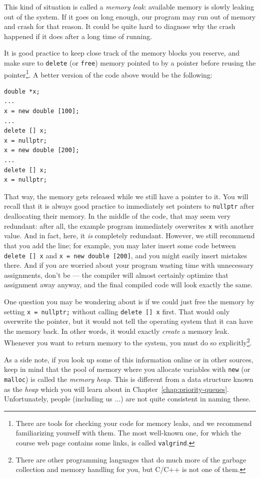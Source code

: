 This kind of situation is called a \emph{memory leak}:
available memory is slowly leaking out of the system.
If it goes on long enough, our program may run out of memory and crash
for that reason. It could be quite hard to diagnose why the crash
happened if it does after a long time of running.

It is good practice to keep close track of the memory blocks you
reserve, and make sure to \texttt{delete} (or \texttt{free}) memory
pointed to by a pointer before reusing the pointer\footnote{There are tools
for checking your code for memory leaks, and we recommend
familiarizing yourself with them. The most well-known one, for which
the course web page contains some links, is called \texttt{valgrind}.}.
A better version of the code above would be the following:

\begin{verbatim}
double *x;
...
x = new double [100];
...
delete [] x;
x = nullptr;
x = new double [200];
...
delete [] x;
x = nullptr;
\end{verbatim}

That way, the memory gets released while we still have a pointer to
it.
You will recall that it is always good practice to immediately set
pointers to \texttt{nullptr} after deallocating their memory.
In the middle of the code, that may seem very redundant:
after all, the example program immediately overwrites \texttt{x} with
another value. 
And in fact, here, it \emph{is} completely redundant.
However, we still recommend that you add the line;
for example, you may later insert some code between \texttt{delete [] x}
and \texttt{x = new double [200]}, and you might easily insert mistakes there.
And if you are worried about your program wasting time with
unnecessary assignments, don't be --- the compiler will almost certainly
optimize that assignment away anyway, and the final compiled code will look
exactly the same.

One question you may be wondering about is if we could just free the
memory by setting \texttt{x = nullptr;}
without calling \texttt{delete [] x} first.
That would only overwrite the pointer, but it would not tell the
operating system that it can have the memory back.
In other words, it would exactly \emph{create} a memory leak.
Whenever you want to return memory to the system, you must do so
explicitly\footnote{There are other programming languages that do much
  more of the garbage collection and memory handling for you,
  but C/C++ is not one of them.}. 

As a side note, if you look up some of this information online or in
other sources, keep in mind that the pool of memory where you allocate
variables with \texttt{new} (or \texttt{malloc}) is called the
\emph{memory heap}.
This is different from a data structure known as the \emph{heap} which
you will learn about in Chapter~\ref{chap:priority-queues}.
Unfortunately, people (including us $\ldots$) are not quite consistent
in naming these.
